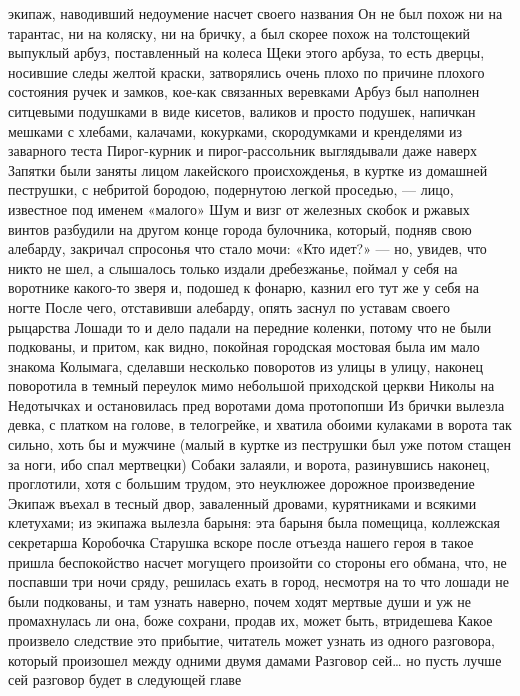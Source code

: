 экипаж, наводивший недоумение насчет своего названия
 Он не был похож ни на тарантас, ни на коляску, ни на бричку, а был скорее похож на толстощекий выпуклый арбуз, поставленный на колеса
 Щеки этого арбуза, то есть дверцы, носившие следы желтой краски, затворялись очень плохо по причине плохого состояния ручек и замков, кое-как связанных веревками
 Арбуз был наполнен ситцевыми подушками в виде кисетов, валиков и просто подушек, напичкан мешками с хлебами, калачами, кокурками, скородумками и кренделями из заварного теста
 Пирог-курник и пирог-рассольник выглядывали даже наверх
 Запятки были заняты лицом лакейского происхожденья, в куртке из домашней пеструшки, с небритой бородою, подернутою легкой проседью, — лицо, известное под именем «малого»
 Шум и визг от железных скобок и ржавых винтов разбудили на другом конце города булочника, который, подняв свою алебарду, закричал спросонья что стало мочи: «Кто идет?» — но, увидев, что никто не шел, а слышалось только издали дребезжанье, поймал у себя на воротнике какого-то зверя и, подошед к фонарю, казнил его тут же у себя на ногте
 После чего, отставивши алебарду, опять заснул по уставам своего рыцарства
 Лошади то и дело падали на передние коленки, потому что не были подкованы, и притом, как видно, покойная городская мостовая была им мало знакома
 Колымага, сделавши несколько поворотов из улицы в улицу, наконец поворотила в темный переулок мимо небольшой приходской церкви Николы на Недотычках и остановилась пред воротами дома протопопши
 Из брички вылезла девка, с платком на голове, в телогрейке, и хватила обоими кулаками в ворота так сильно, хоть бы и мужчине (малый в куртке из пеструшки был уже потом стащен за ноги, ибо спал мертвецки)
 Собаки залаяли, и ворота, разинувшись наконец, проглотили, хотя с большим трудом, это неуклюжее дорожное произведение
 Экипаж въехал в тесный двор, заваленный дровами, курятниками и всякими клетухами; из экипажа вылезла барыня: эта барыня была помещица, коллежская секретарша Коробочка
 Старушка вскоре после отъезда нашего героя в такое пришла беспокойство насчет могущего произойти со стороны его обмана, что, не поспавши три ночи сряду, решилась ехать в город, несмотря на то что лошади не были подкованы, и там узнать наверно, почем ходят мертвые души и уж не промахнулась ли она, боже сохрани, продав их, может быть, втридешева
 Какое произвело следствие это прибытие, читатель может узнать из одного разговора, который произошел между одними двумя дамами
 Разговор сей… но пусть лучше сей разговор будет в следующей главе
